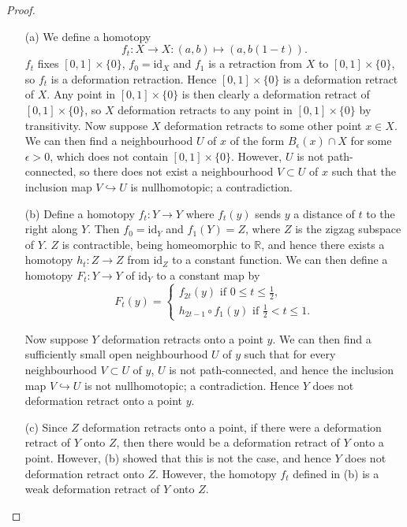 \documentclass{article}
\begin{document}
\begin{proof}
\begin{enumerate}
\item[(a)] We define a homotopy \[f_t:X\to X:(a,b) \mapsto (a,b(1-t)).\] $f_t$ fixes $[0,1]\times\{0\}$, $f_0=\text{id}_X$ and $f_1$ is a retraction from $X$ to $[0,1]\times\{0\}$, so $f_t$ is a deformation retraction. Hence $[0,1]\times\{0\}$ is a deformation retract of $X$. Any point in $[0,1]\times\{0\}$ is then clearly a deformation retract of $[0,1]\times\{0\}$, so  $X$ deformation retracts to any point in $[0,1]\times\{0\}$ by transitivity. Now suppose $X$ deformation retracts to some other point $x\in X$. We can then find a neighbourhood $U$ of $x$ of the form $B_\epsilon(x)\cap X$ for some $\epsilon > 0$, which does not contain $[0,1]\times\{0\}$. However, $U$ is not path-connected, so there does not exist a neighbourhood $V\subset U$ of $x$ such that the inclusion map $V\hookrightarrow U$ is nullhomotopic; a contradiction.
\item[(b)] Define a homotopy $f_t:Y\to Y$ where $f_t(y)$ sends $y$ a distance of $t$ to the right along $Y$. Then $f_0=\text{id}_Y$ and $f_1(Y)=Z$, where $Z$ is the zigzag subspace of $Y$. $Z$ is contractible, being homeomorphic to $\mathbb{R}$, and hence there exists a homotopy $h_t:Z\to Z$ from $\text{id}_Z$ to a constant function. We can then define a homotopy $F_t:Y\to Y$ of $\text{id}_Y$ to a constant map by\[F_t(y)=\begin{cases}
    f_{2t}(y)\text{ if }0\leq t\leq\frac{1}{2},
    \\h_{2t-1}\circ f_1(y)\text{ if }\frac{1}{2}< t\leq 1.
\end{cases}\]

Now suppose $Y$ deformation retracts onto a point $y$. We can then find a sufficiently small open neighbourhood $U$ of $y$ such that for every neighbourhood $V\subset U$ of $y$, $U$ is not path-connected, and hence the inclusion map $V\hookrightarrow U$ is not nullhomotopic; a contradiction. Hence $Y$ does not deformation retract onto a point $y$.
\item[(c)] Since $Z$ deformation retracts onto a point, if there were a deformation retract of $Y$ onto $Z$, then there would be a deformation retract of $Y$ onto a point. However, (b) showed that this is not the case, and hence $Y$ does not deformation retract onto $Z$. However, the homotopy $f_t$ defined in (b) is a weak deformation retract of $Y$ onto $Z$.
\end{enumerate}
\end{proof}
\end{document}
